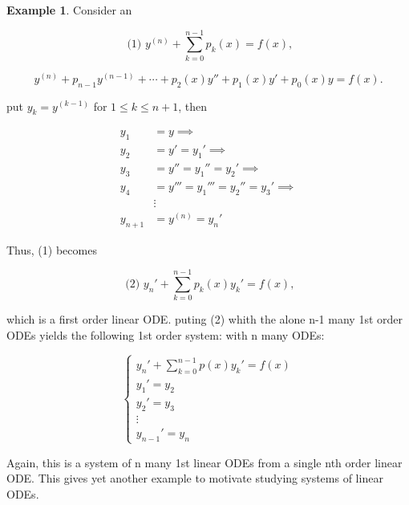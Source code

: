 \documentclass[12pt,a4paper]{article}
\theoremstyle{definition}
\newtheorem*{example}{Example}
\begin{document}
\begin{example}
  Consider an 

  \[ \text{ (1) } y^{(n)}+ \sum_{k=0}^{n-1} p_k(x) = f(x), \]

  \[ y^{(n)} + p_{n-1}y^{(n-1)} + \cdots + p_2(x)y'' + p_1(x)y' +
  p_0(x)y = f(x). \]

  put \(y_k = y^{(k-1)}  \) for \( 1 \leq k \leq n+1 \), then 

  \begin{align*}
    y_1 &= y \implies \\
    y_2 &= y' = y_1' \implies \\
    y_3 &= y'' = y_1'' = y_2' \implies \\
    y_4 &= y''' = y_1''' = y_2'' = y_3'  \implies \\
    &\vdots \\
    y_{n+1} &= y^{(n)} = y_n'
  \end{align*}

  Thus, (1) becomes 

  \[ \text{ (2) } y_n' + \sum_{k=0}^{n-1}p_k(x)y_k' = f(x), \]

  which is a first order linear ODE. puting (2) whith the alone n-1
  many 1st order ODEs yields the following 1st order system: with n
  many ODEs:

  \[
  \begin{cases}
    y_n' + \sum_{k=0}^{n-1}p(x)y_k' = f(x)  \\
    y_1' = y_2 \\
    y_2' = y_3 \\
    \vdots \\
    y_{n-1}' = y_n
  \end{cases}
  \]

  Again, this is a system of n many 1st linear ODEs from a single nth
  order linear ODE. This gives yet another example to motivate studying
  systems of linear ODEs.

\end{example}
\end{document}
